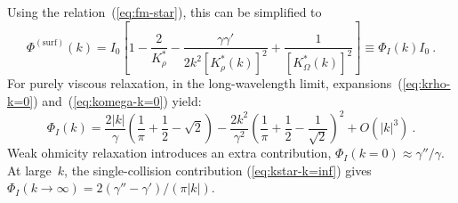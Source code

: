 \documentclass[preprint,aps,eqsecnum]{revtex4-1}
\begin{document}
Using the relation~(\ref{eq:fm-star}), this can be simplified to
\begin{equation}
  \label{eq:phi-iso-surf}
  \Phi^\mathrm{(surf)}(k) =
  I_0 \left[1  - \frac{2}{K_\rho^\ast}
    - \frac{\gamma \gamma'}{2k^2 \left[K_\rho^\ast(k)\right]^2}
    + \frac{1}{\left[K_\Omega^\ast(k)\right]^2}
  \right]
\equiv \Phi_I(k) I_0 \ .
\end{equation}
%
For purely viscous relaxation, in the long-wavelength limit,
expansions~(\ref{eq:krho-k=0}) and~(\ref{eq:komega-k=0}) yield: 
\begin{equation}
  \label{eq:phi-I-low}
  \Phi_I(k) = \frac{2|k|}{\gamma} \left(\frac{1}{\pi} + \frac{1}{2}
    - \sqrt{2}\right)
  - \frac{2k^2}{\gamma^2}
    \left(\frac{1}{\pi} + \frac{1}{2} - \frac{1}{\sqrt{2}}\right)^2
    + O(|k|^3)
\ . 
\end{equation}
Weak ohmicity relaxation introduces an extra contribution,
$\Phi_I(k = 0) \approx \gamma'' / \gamma$. 
At large~$k$, the single-collision contribution (\ref{eq:kstar-k=inf}) gives
$\Phi_I(k\to \infty) = 2 (\gamma'' - \gamma')/(\pi |k|)$.
\end{document}
